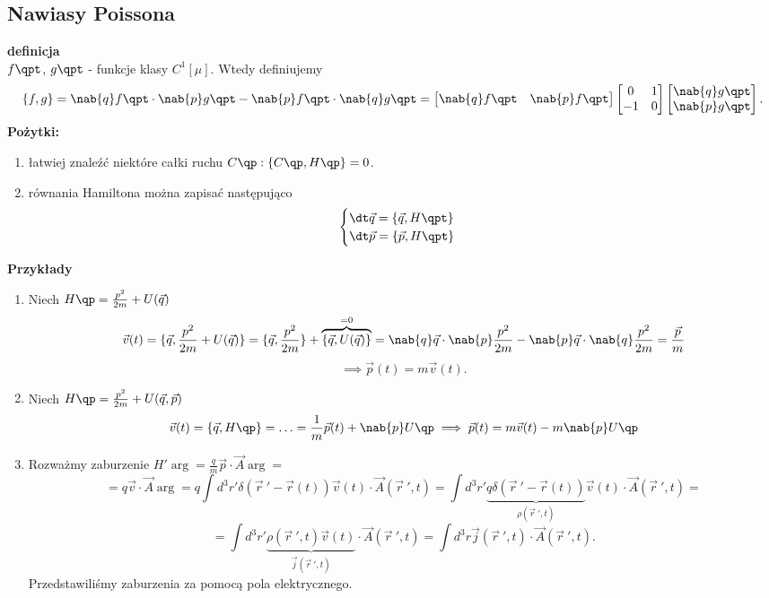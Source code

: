 \subsection{Nawiasy Poissona}
\textbf{definicja}\\
$f\qpt $, $g\qpt$ - funkcje klasy $C^1[\mu]$. Wtedy definiujemy 
$$ \{ f,g \}= \nab{q} f\qpt \cdot \nab{p} g\qpt - \nab{p} f\qpt \cdot \nab{q}
g\qpt = \left[ \begin{matrix} \nab{q} f\qpt & \nab{p}f\qpt  \end{matrix} \right]
 \left[ \begin{matrix} 0 & 1 \\ -1 & 0 \end{matrix} \right] 
 \left[ \begin{matrix} \nab{q} g\qpt \\ \nab{p} g\qpt \end{matrix} \right].$$
\textbf{Pożytki:}
\begin{enumerate}
	\item łatwiej znaleźć niektóre całki ruchu $C\qp : \{ C\qp, H\qp \} =0$.
	\item równania Hamiltona można zapisać następująco
	\begin{equation}
		\begin{cases}
		\dt \vec{q} =  \{ \vec{q} , H\qpt \} \\
		\dt \vec{p} =  \{ \vec{p} , H\qpt \} 
		\end{cases}
	\end{equation}
\end{enumerate}
\textbf{Przykłady}
\begin{enumerate}
	\item Niech $H\qp = \frac{p^2}{2m} + U(\vec{q})$
	$$ \vec{v} (t) = \{ \vec{q} , \frac{p^2}{2m} + U(\vec{q}) \} = \{ \vec{q}
	, \frac{p^2}{2m} \} + \overbrace{\{ \vec{q} , U(\vec{q}) \}}^{=0} = 
	\nab{q}\vec{q} \cdot \nab{p} \frac{p^2}{2m} - \nab{p} \vec{q} \cdot 
	\nab{q} \frac{p^2}{2m} = \frac{\vec{p}}{m}$$
	$$\implies \vec{p}(t) = m \vec{v}(t).$$
	\item Niech $H\qp = \frac{p^2}{2m} + U(\vec{q},\vec{p})$
	$$ \vec{v}(t) = \{ \vec{q}, H\qp \} = \ldots = \frac{1}{m} \vec{p}(t)
	+\nab{p} U\qp \implies \vec{p} (t) = m\vec{v}(t) - m\nab{p}U\qp$$
	\item Rozważmy zaburzenie $H'\arg = \frac{q}{m} \vec{p}\cdot \vec{A}\arg=$
	$$= q\vec{v} \cdot \vec{A}\arg = q \int d^3r'\delta(\vec{r}\ ' - 
	\vec{r}(t)) \vec{v}(t)\cdot \vec{A} (\vec{r}\ ',t)=\int d^3r' \underbrace{
	q \delta(\vec{r}\ ' - \vec{r}(t))}_{\rho (\vec{r}\ ',t)} \vec{v}(t)\cdot 
	\vec{A}(\vec{r}\ '	, t ) =$$
	$$= \int d^3r' \underbrace{\rho (\vec{r}\ ',t) \vec{v}(t)}_{\vec{j}
	(\vec{r}\ ',t)} \cdot \vec{A}(\vec{r}\	 ' ,t) = \int d^3r \vec{j} 
	(\vec{r}\ ',t)\cdot \vec{A} (\vec{r}\ ' ,t).$$
	Przedstawiliśmy zaburzenia za pomocą pola elektrycznego.
\end{enumerate}

